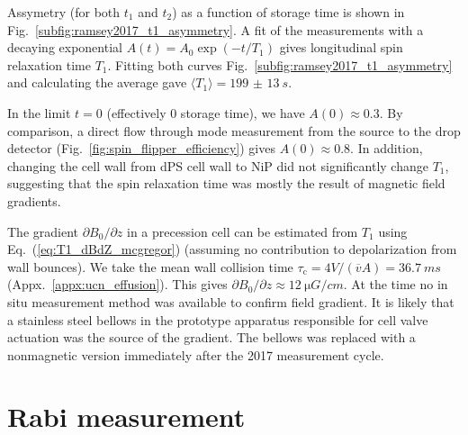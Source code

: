 Assymetry (for both $t_1$ and $t_2$) as a function of storage time is shown in Fig.~\ref{subfig:ramsey2017_t1_asymmetry}. A fit of the measurements with a decaying exponential $A(t)=A_0\exp(-t/T_1)$ gives longitudinal spin relaxation time $T_1$. Fitting both curves Fig.~\ref{subfig:ramsey2017_t1_asymmetry} and calculating the average gave $\langle T_1 \rangle=\qty{199(13)}{s}$. 

In the limit $t=0$ (effectively 0 storage time), we have $A(0)\approx 0.3$. By comparison, a direct flow through mode measurement from the \ucn source to the drop detector (Fig.~\ref{fig:spin_flipper_efficiency}) gives $A(0)\approx 0.8$. In addition, changing the cell wall from dPS cell wall to NiP did not significantly change $T_1$, suggesting that the spin relaxation time was mostly the result of magnetic field gradients.

The gradient $\partial B_0 / \partial z$ in a precession cell can be estimated from $T_1$ using Eq.~(\ref{eq:T1_dBdZ_mcgregor}) (assuming no contribution to depolarization from wall bounces). We take the mean wall collision time $\tau_\text{c}=4V/(\overline{v}A)=\qty{36.7}{ms}$ (Appx.~\ref{appx:ucn_effusion}). This gives $\partial B_0/\partial z\approx \qty{12}{\micro G\per cm}$. At the time no in situ measurement method was available to confirm field gradient. It is likely that a stainless steel bellows in the prototype apparatus responsible for cell valve actuation was the source of the gradient. The bellows was replaced with a nonmagnetic version immediately after the 2017 measurement cycle.


\section{Rabi measurement}\label{sec:2017_rabi_measurement}


